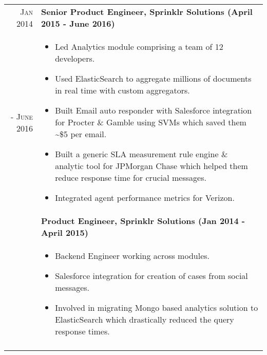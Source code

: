\documentclass[a4paper,10pt]{article}
\begin{document}
\begin{tabular}{r|p{16cm}}
 \textsc{Jan 2014 } & \textbf{Senior Product Engineer, Sprinklr Solutions (April 2015 - June 2016)} \\\textsc{- June 2016}&
 \begin{itemize}[noitemsep]
 \item Led Analytics module comprising a team of 12 developers.
 \item Used ElasticSearch to aggregate millions of documents in real time with custom aggregators.
 \item Built Email auto responder with Salesforce integration for Procter \& Gamble using SVMs which saved them \textasciitilde\$5 per email.
 \item Built a generic SLA measurement rule engine \& analytic tool for JPMorgan Chase which helped them reduce response time for crucial messages.
 \item Integrated agent performance metrics for Verizon.
 \end{itemize}
 \\&
 \textbf{Product Engineer, Sprinklr Solutions (Jan 2014 - April 2015)} \\&
 \begin{itemize}[noitemsep]
 \item Backend Engineer working across modules.
 \item Salesforce integration for creation of cases from social messages.
 \item Involved in migrating Mongo based analytics solution to ElasticSearch which drastically reduced the query response times.
 \end{itemize}
 \\\multicolumn{2}{c}{} \\
\end{tabular}


\end{document}
